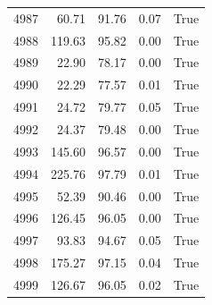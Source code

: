 \begin{longtable}{rrrrr}
4987 & 60.71 & 91.76 & 0.07 & True \\
4988 & 119.63 & 95.82 & 0.00 & True \\
4989 & 22.90 & 78.17 & 0.00 & True \\
4990 & 22.29 & 77.57 & 0.01 & True \\
4991 & 24.72 & 79.77 & 0.05 & True \\
4992 & 24.37 & 79.48 & 0.00 & True \\
4993 & 145.60 & 96.57 & 0.00 & True \\
4994 & 225.76 & 97.79 & 0.01 & True \\
4995 & 52.39 & 90.46 & 0.00 & True \\
4996 & 126.45 & 96.05 & 0.00 & True \\
4997 & 93.83 & 94.67 & 0.05 & True \\
4998 & 175.27 & 97.15 & 0.04 & True \\
4999 & 126.67 & 96.05 & 0.02 & True \\
\end{longtable}
